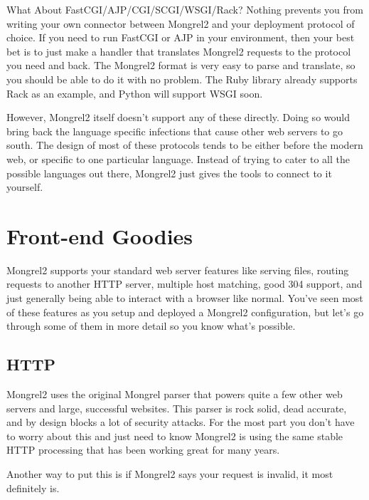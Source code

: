 \begin{aside}{What About FastCGI/AJP/CGI/SCGI/WSGI/Rack?}
Nothing prevents you from writing your own connector between Mongrel2 and your
deployment protocol of choice.  If you need to run FastCGI or AJP in your environment,
then your best bet is to just make a handler that translates Mongrel2 requests
to the protocol you need and back.  The Mongrel2 format is very easy to parse and
translate, so you should be able to do it with no problem.  The Ruby library already supports
Rack as an example, and Python will support WSGI soon.

However, Mongrel2 itself doesn't support any of these directly.  Doing so would bring
back the language specific infections that cause other web servers to go south.  The
design of most of these protocols tends to be either before the modern web, or specific
to one particular language.  Instead of trying to cater to all the possible languages
out there, Mongrel2 just gives the tools to connect to it yourself.
\end{aside}


\section{Front-end Goodies}

Mongrel2 supports your standard web server features like serving files, routing requests to
another HTTP server, multiple host matching, good 304 support, and just generally being able
to interact with a browser like normal.  You've seen most of these features as you setup and
deployed a Mongrel2 configuration, but let's go through some of them in more detail so you
know what's possible.


\subsection{HTTP}

Mongrel2 uses the original Mongrel parser that powers quite a few other web servers and large,
successful websites.  This parser is rock solid, dead accurate, and by design blocks a lot of
security attacks.  For the most part you don't have to worry about this and just need to know
Mongrel2 is using the same stable HTTP processing that has been working great for many years.

Another way to put this is if Mongrel2 says your request is invalid, it most definitely is.

